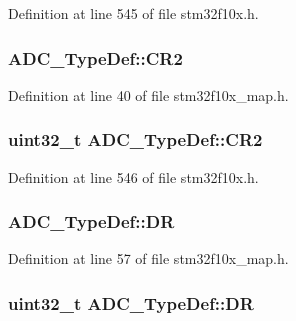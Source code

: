 Definition at line 545 of file stm32f10x.\+h.

\subsubsection[{\texorpdfstring{C\+R2}{CR2}}]{ A\+D\+C\+\_\+\+Type\+Def\+::\+C\+R2}\hypertarget{struct_a_d_c___type_def_a801ba5b7d448bc007b648ffdd118ca4f}{}\label{struct_a_d_c___type_def_a801ba5b7d448bc007b648ffdd118ca4f}


Definition at line 40 of file stm32f10x\+\_\+map.\+h.

\subsubsection[{\texorpdfstring{C\+R2}{CR2}}]{ {\bf uint32\+\_\+t} A\+D\+C\+\_\+\+Type\+Def\+::\+C\+R2}\hypertarget{struct_a_d_c___type_def_a1053a65a21af0d27afe1bf9cf7b7aca7}{}\label{struct_a_d_c___type_def_a1053a65a21af0d27afe1bf9cf7b7aca7}


Definition at line 546 of file stm32f10x.\+h.

\subsubsection[{\texorpdfstring{DR}{DR}}]{ A\+D\+C\+\_\+\+Type\+Def\+::\+DR}\hypertarget{struct_a_d_c___type_def_a549aef11dc9b3f77ffe12316c31a9f92}{}\label{struct_a_d_c___type_def_a549aef11dc9b3f77ffe12316c31a9f92}


Definition at line 57 of file stm32f10x\+\_\+map.\+h.

\subsubsection[{\texorpdfstring{DR}{DR}}]{ {\bf uint32\+\_\+t} A\+D\+C\+\_\+\+Type\+Def\+::\+DR}\hypertarget{struct_a_d_c___type_def_a84114accead82bd11a0e12a429cdfed9}{}\label{struct_a_d_c___type_def_a84114accead82bd11a0e12a429cdfed9}


